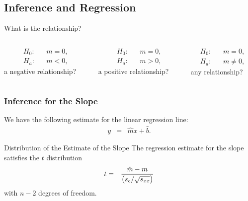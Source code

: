 \subsection{Inference and Regression}

\begin{frame}{What is the relationship?}


    \begin{columns}
      \begin{column}{.33\textwidth}
        \begin{eqnarray*}
          H_0: & & m=0, \\
          H_a: & & m<0,
        \end{eqnarray*}
        a negative relationship?

        \vfill
      \end{column}
      \vrule{}

      \begin{column}{.33\textwidth}
        \begin{eqnarray*}
          H_0: & & m=0, \\
          H_a: & & m>0,
        \end{eqnarray*}
        a positive relationship?

        \vfill
      \end{column}
      \vrule{}

      \begin{column}{.33\textwidth}
        \begin{eqnarray*}
          H_0: & & m=0, \\
          H_a: & & m\neq 0,
        \end{eqnarray*}
        any relationship?

        \vfill
      \end{column}
      \vrule{}
      
    \end{columns}

  
\end{frame}

\begin{frame}
  \frametitle{Inference for the Slope}

  We have the following estimate for the linear regression line:
  \begin{eqnarray*}
    y & = & \hat{m} x + \hat{b}.
  \end{eqnarray*}

  \begin{block}{Distribution of the Estimate of the Slope}
    The regression estimate for the slope satisfies the $t$ distribution
    \begin{eqnarray*}
      t & = & \frac{\hat{m}-m}{\left( s_e/\sqrt{s_{xx}} \right)}
    \end{eqnarray*}
    with $n-2$ degrees of freedom.
  \end{block}


\end{frame}

